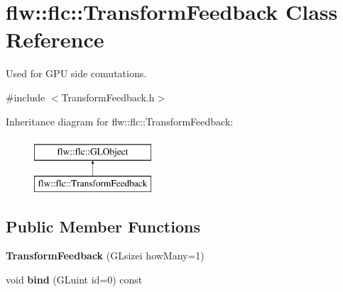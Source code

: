 \hypertarget{classflw_1_1flc_1_1TransformFeedback}{}\section{flw\+:\+:flc\+:\+:Transform\+Feedback Class Reference}
\label{classflw_1_1flc_1_1TransformFeedback}


Used for G\+PU side comutations.  




{\ttfamily \#include $<$Transform\+Feedback.\+h$>$}

Inheritance diagram for flw\+:\+:flc\+:\+:Transform\+Feedback\+:\begin{figure}[H]
\begin{center}
\leavevmode
\includegraphics[height=2.000000cm]{classflw_1_1flc_1_1TransformFeedback}
\end{center}
\end{figure}
\subsection*{Public Member Functions}
\begin{DoxyCompactItemize}
\item 
\mbox{\label{classflw_1_1flc_1_1TransformFeedback_aeb7c90098d1d7be731e2c2e1042a20ea}} 
{\bfseries Transform\+Feedback} (G\+Lsizei how\+Many=1)
\item 
\mbox{\label{classflw_1_1flc_1_1TransformFeedback_a2b2d302939508ac65ead1f8a9bd10cc1}} 
void {\bfseries bind} (G\+Luint id=0) const
\end{DoxyCompactItemize}
